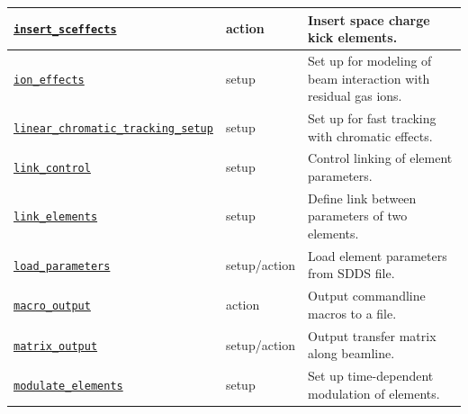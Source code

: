 \documentclass[11pt]{article}
\begin{document}
\begin{longtable}{|p{2.75in}|p{0.75in}|p{2.75in}|}
\hyperref[subsec:insertsceffects]{\tt insert\_sceffects} & action & Insert space charge kick elements. \\ \hline
\hyperref[subsec:ioneffects]{\tt ion\_effects} & setup & Set up for modeling of beam interaction with residual gas ions. \\ \hline
\hyperref[subsec:linearchromatictrackingsetup]{\tt linear\_chromatic\_tracking\_setup} & setup & Set up for fast tracking with chromatic effects. \\ \hline
\hyperref[subsec:linkcontrol]{\tt link\_control} & setup & Control linking of element parameters. \\ \hline
\hyperref[subsec:linkelements]{\tt link\_elements} & setup & Define link between parameters of two elements. \\ \hline
\hyperref[subsec:loadparameters]{\tt load\_parameters} & setup/action & Load element parameters from SDDS file. \\ \hline
\hyperref[subsec:macrooutput]{\tt macro\_output} & action & Output commandline macros to a file. \\ \hline
\hyperref[subsec:matrixoutput]{\tt matrix\_output} & setup/action & Output transfer matrix along beamline. \\ \hline
\hyperref[subsec:modulateelements]{\tt modulate\_elements} & setup & Set up time-dependent modulation of elements. \\ \hline


\end{longtable}
\end{document}
